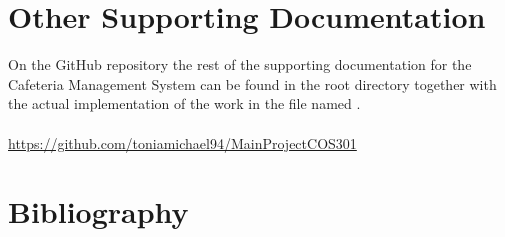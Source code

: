 \documentclass[a4paper,12pt]{article}
\begin{document}
\section{Other Supporting Documentation}

On the GitHub repository the rest of the supporting documentation for the Cafeteria Management System can be found in the root directory together with the actual implementation of the work in the file named . \\\\
 \url{https://github.com/toniamichael94/MainProjectCOS301}

\newpage
\section{Bibliography}
\end{document}
